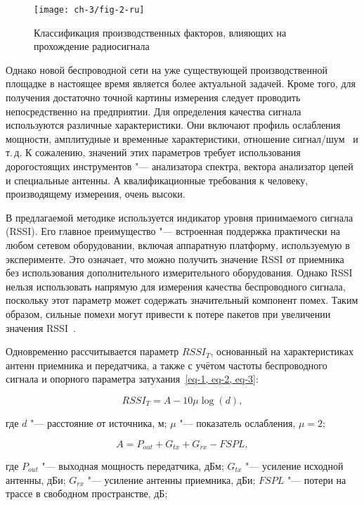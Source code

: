 \begin{figure*}[ht]
	\centering
	\texttt{[image: ch-3/fig-2-ru]}
	\caption{Классификация производственных факторов, влияющих на прохождение радиосигнала}
	\label{ch-3/fig-2}
\end{figure*}

Однако новой беспроводной сети на уже существующей производственной площадке в настоящее время является более актуальной задачей. Кроме того, для получения достаточно точной картины измерения следует проводить непосредственно на предприятии. Для определения качества сигнала используются различные характеристики. Они включают профиль ослабления мощности, амплитудные и временные характеристики, отношение сигнал/шум~\cite{6133782} и т.\,д. К сожалению, значений этих параметров требует использования дорогостоящих инструментов "--- анализатора спектра, вектора анализатор цепей и специальные антенны. А квалификационные требования к человеку, производящему измерения, очень высоки.

В предлагаемой методике используется индикатор уровня принимаемого сигнала (RSSI). Его главное преимущество "--- встроенная поддержка практически на любом сетевом оборудовании, включая аппаратную платформу, используемую в эксперименте. Это означает, что можно получить значение RSSI от приемника без использования дополнительного измерительного оборудования. Однако RSSI нельзя использовать напрямую для измерения качества беспроводного сигнала, поскольку этот параметр может содержать значительный компонент помех. Таким образом, сильные помехи могут привести к потере пакетов при увеличении значения RSSI~\cite{8211460}.

Одновременно рассчитывается параметр $RSSI_T$, основанный на характеристиках антенн приемника и передатчика, а также с учётом частоты беспроводного сигнала и опорного параметра затухания~\cref{eq-1, eq-2, eq-3}:

\begin{equation}
	RSSI_T = A-10 \mu\log (d),
	\label{eq-1}
\end{equation}

\noindent где $d$ "--- расстояние от источника, м; $\mu$ "--- показатель ослабления, $\mu = 2$;

\begin{equation}
	A = P_{out} + G_{tx} + G_{rx} -FSPL,
	\label{eq-2}
\end{equation}

\noindent где $P_{out}$ "--- выходная мощность передатчика, дБм; $G_{tx}$ "--- усиление исходной антенны, дБи; $G_{rx}$ "--- усиление антенны приемника, дБи; $FSPL$ "--- потери на трассе в свободном пространстве, дБ;

